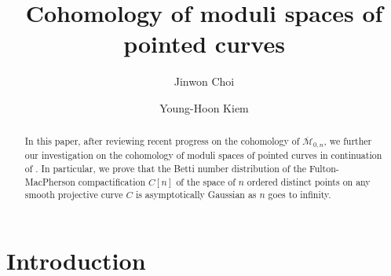 \documentclass[11pt,letterpaper]{amsart}
\title{Cohomology of moduli spaces of pointed curves}
\author{Jinwon Choi}
\author{Young-Hoon Kiem}
\date{}
\numberwithin{equation}{section}
\theoremstyle{definition}
\newcommand{\cal}{\mathcal}
\def\cM{{\cal M}}
\def\mzn{\overline{\cM}_{0,n} }
\begin{document}
\begin{abstract}
    In this paper, after reviewing recent progress on the cohomology of $\mzn$, we further our investigation on the cohomology of moduli spaces of pointed curves in continuation of \cite{BK, CK0, CK, CKL1, CKL2, CKL3}. In particular, we prove that the Betti number distribution of the Fulton-MacPherson compactification $C[n]$ of the space of $n$ ordered distinct points on any smooth projective curve $C$ is asymptotically Gaussian as $n$ goes to infinity.
\end{abstract}
\maketitle


\section{Introduction}\label{S1}
\end{document}
